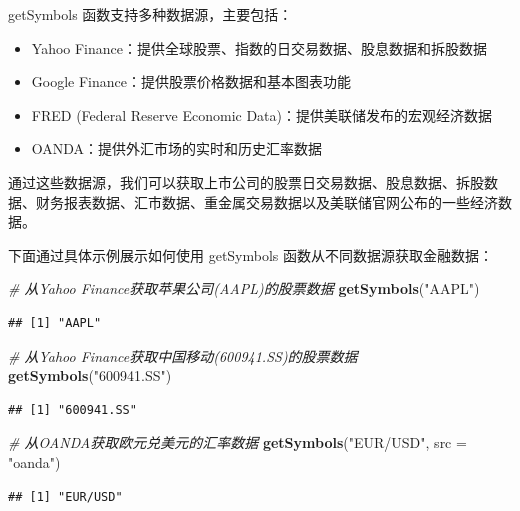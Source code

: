 \documentclass[]{ctexbook}
\newenvironment{Shaded}{\begin{snugshade}}{\end{snugshade}}
\newcommand{\AttributeTok}[1]{\textcolor[rgb]{0.13,0.29,0.53}{#1}}
\newcommand{\CommentTok}[1]{\textcolor[rgb]{0.56,0.35,0.01}{\textit{#1}}}
\newcommand{\FunctionTok}[1]{\textcolor[rgb]{0.13,0.29,0.53}{\textbf{#1}}}
\newcommand{\NormalTok}[1]{#1}
\newcommand{\StringTok}[1]{\textcolor[rgb]{0.31,0.60,0.02}{#1}}
\providecommand{\tightlist}{%
  \setlength{\itemsep}{0pt}\setlength{\parskip}{0pt}}
\begin{document}
getSymbols 函数支持多种数据源，主要包括：

\begin{itemize}
\tightlist
\item
  Yahoo Finance：提供全球股票、指数的日交易数据、股息数据和拆股数据
\item
  Google Finance：提供股票价格数据和基本图表功能
\item
  FRED (Federal Reserve Economic Data)：提供美联储发布的宏观经济数据
\item
  OANDA：提供外汇市场的实时和历史汇率数据
\end{itemize}

通过这些数据源，我们可以获取上市公司的股票日交易数据、股息数据、拆股数据、财务报表数据、汇市数据、重金属交易数据以及美联储官网公布的一些经济数据。

下面通过具体示例展示如何使用 getSymbols 函数从不同数据源获取金融数据：

\begin{Shaded}
\begin{Highlighting}[]
\CommentTok{\# 从Yahoo Finance获取苹果公司(AAPL)的股票数据}
\FunctionTok{getSymbols}\NormalTok{(}\StringTok{"AAPL"}\NormalTok{)}
\end{Highlighting}
\end{Shaded}

\begin{verbatim}
## [1] "AAPL"
\end{verbatim}

\begin{Shaded}
\begin{Highlighting}[]
\CommentTok{\# 从Yahoo Finance获取中国移动(600941.SS)的股票数据}
\FunctionTok{getSymbols}\NormalTok{(}\StringTok{"600941.SS"}\NormalTok{)}
\end{Highlighting}
\end{Shaded}

\begin{verbatim}
## [1] "600941.SS"
\end{verbatim}

\begin{Shaded}
\begin{Highlighting}[]
\CommentTok{\# 从OANDA获取欧元兑美元的汇率数据}
\FunctionTok{getSymbols}\NormalTok{(}\StringTok{"EUR/USD"}\NormalTok{, }\AttributeTok{src =} \StringTok{"oanda"}\NormalTok{)}
\end{Highlighting}
\end{Shaded}

\begin{verbatim}
## [1] "EUR/USD"
\end{verbatim}
\end{document}
